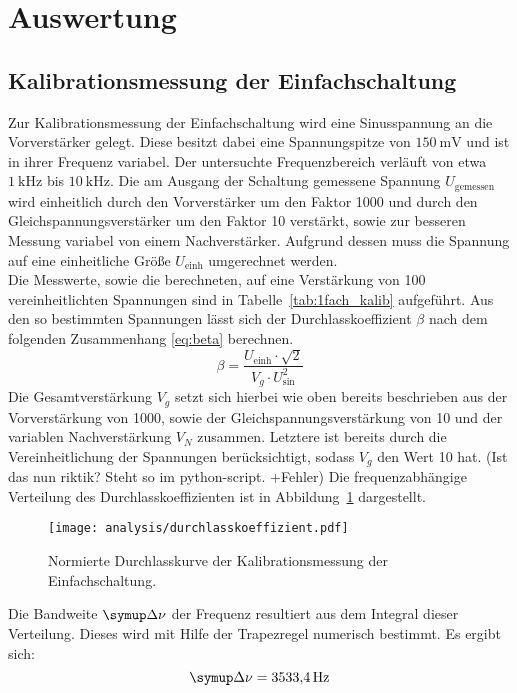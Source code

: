 \section{Auswertung}
\label{sec:auswertung}

\subsection{Kalibrationsmessung der Einfachschaltung}
%
Zur Kalibrationsmessung der Einfachschaltung wird eine Sinusspannung an die
Vorverstärker gelegt. Diese besitzt dabei eine Spannungspitze von
$\SI{150}{\milli\volt}$ und ist in ihrer Frequenz variabel. Der untersuchte
Frequenzbereich verläuft von etwa $\SI{1}{\kilo\hertz}$ bis
$\SI{10}{\kilo\hertz}$. Die am Ausgang der Schaltung gemessene Spannung
$U_\text{gemessen}$ wird einheitlich durch den Vorverstärker um den Faktor
\num{1000} und durch den Gleichspannungsverstärker um den Faktor \num{10}
verstärkt, sowie zur besseren Messung variabel von einem Nachverstärker.
Aufgrund dessen muss die Spannung auf eine einheitliche Größe $U_\text{einh}$
umgerechnet werden.\\
%
Die Messwerte, sowie die berechneten, auf eine Verstärkung von \num{100}
vereinheitlichten Spannungen sind in Tabelle~\ref{tab:1fach_kalib} aufgeführt.
Aus den so bestimmten Spannungen lässt sich der Durchlasskoeffizient $\beta$
nach dem folgenden Zusammenhang \eqref{eq:beta} berechnen.
%
\begin{equation}
  \beta= \frac{U_\text{einh} \cdot \sqrt{2}}{V_g \cdot U_\text{sin}^2}
  \label{eq:beta}
\end{equation}
%
Die Gesamtverstärkung $V_g$ setzt sich hierbei wie oben bereits beschrieben aus
der Vorverstärkung von \num{1000}, sowie der Gleichspannungsverstärkung von
\num{10} und der variablen Nachverstärkung $V_N$ zusammen. Letztere ist bereits
durch die Vereinheitlichung der Spannungen berücksichtigt, sodass $V_g$ den Wert
\num{10} hat. (Ist das nun riktik? Steht so im python-script. +Fehler)
Die frequenzabhängige Verteilung des Durchlasskoeffizienten ist in
Abbildung~\ref{fig:beta} dargestellt.
%
\begin{figure}
  \texttt{[image: analysis/durchlasskoeffizient.pdf]}
  \caption{Normierte Durchlasskurve der Kalibrationsmessung der Einfachschaltung.}
  \label{fig:beta}
\end{figure}
%
Die Bandweite $\upD\nu$ der Frequenz resultiert aus dem Integral dieser
Verteilung. Dieses wird mit Hilfe der Trapezregel numerisch bestimmt. Es ergibt
sich:
%
\begin{equation}
  \upD\nu=\SI{3533.4}{\hertz}
\end{equation}
%
